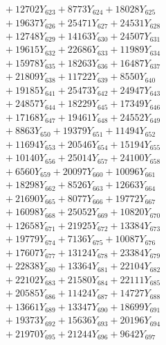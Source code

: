 \documentclass[a4paper,10pt]{article}
\begin{document}
{\begin{align}
&\;  + 12702 Y_{623} + 8773 Y_{624} + 18028 Y_{625} \\[0.3ex]
&\;  + 19637 Y_{626} + 25471 Y_{627} + 24531 Y_{628} \\[0.5ex]\allowbreak
&\;  + 12748 Y_{629} + 14163 Y_{630} + 24507 Y_{631} \\[0.3ex]
&\;  + 19615 Y_{632} + 22686 Y_{633} + 11989 Y_{634} \\[0.3ex]
&\;  + 15978 Y_{635} + 18263 Y_{636} + 16487 Y_{637} \\[0.3ex]
&\;  + 21809 Y_{638} + 11722 Y_{639} + 8550 Y_{640} \\[0.3ex]
&\;  + 19185 Y_{641} + 25473 Y_{642} + 24947 Y_{643} \\[0.3ex]
&\;  + 24857 Y_{644} + 18229 Y_{645} + 17349 Y_{646} \\[0.3ex]
&\;  + 17168 Y_{647} + 19461 Y_{648} + 24552 Y_{649} \\[0.3ex]
&\;  + 8863 Y_{650} + 19379 Y_{651} + 11494 Y_{652} \\[0.3ex]
&\;  + 11694 Y_{653} + 20546 Y_{654} + 15194 Y_{655} \\[0.3ex]
&\;  + 10140 Y_{656} + 25014 Y_{657} + 24100 Y_{658} \\[0.5ex]\allowbreak
&\;  + 6560 Y_{659} + 20097 Y_{660} + 10096 Y_{661} \\[0.3ex]
&\;  + 18298 Y_{662} + 8526 Y_{663} + 12663 Y_{664} \\[0.3ex]
&\;  + 21690 Y_{665} + 8077 Y_{666} + 19772 Y_{667} \\[0.3ex]
&\;  + 16098 Y_{668} + 25052 Y_{669} + 10820 Y_{670} \\[0.3ex]
&\;  + 12658 Y_{671} + 21925 Y_{672} + 13384 Y_{673} \\[0.3ex]
&\;  + 19779 Y_{674} + 7136 Y_{675} + 10087 Y_{676} \\[0.3ex]
&\;  + 17607 Y_{677} + 13124 Y_{678} + 23384 Y_{679} \\[0.3ex]
&\;  + 22838 Y_{680} + 13364 Y_{681} + 22104 Y_{682} \\[0.3ex]
&\;  + 22102 Y_{683} + 21580 Y_{684} + 22111 Y_{685} \\[0.3ex]
&\;  + 20585 Y_{686} + 11424 Y_{687} + 14727 Y_{688} \\[0.5ex]\allowbreak
&\;  + 13661 Y_{689} + 13347 Y_{690} + 18699 Y_{691} \\[0.3ex]
&\;  + 19373 Y_{692} + 15636 Y_{693} + 20196 Y_{694} \\[0.3ex]
&\;  + 21970 Y_{695} + 21244 Y_{696} + 9642 Y_{697} \\[0.3ex]

\end{align}}
\end{document}
